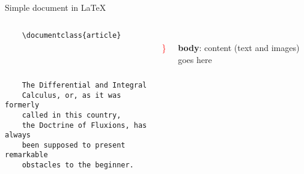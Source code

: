 

\begin{frame}[fragile, t]{Simple document in \LaTeX}
	\begin{columns}
        \begin{column}{0.5\textwidth}
	\begin{verbatim} 
	\documentclass{article}

		
	

	The Differential and Integral 
	Calculus, or, as it was formerly 
	called in this country, 
	the Doctrine of Fluxions, has always 
	been supposed to present remarkable 
	obstacles to the beginner.

	
	\end{verbatim}
\end{column}
\begin{column}{0.05\textwidth}
	\phantom{{\Huge \textcolor{red}{ \} } }}
	\\[2cm]
	{\Huge \textcolor{red}{ \} } }
	
\end{column}
\begin{column}{0.4\textwidth}
	\\[2cm]
	\textbf{body}: content (text and images) goes here
\end{column}
\end{columns}

\end{frame}
